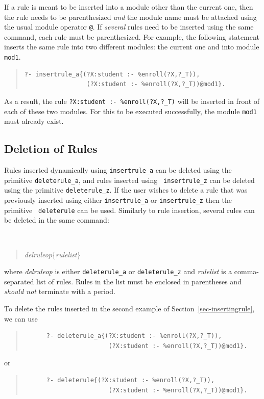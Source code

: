\documentclass[11pt]{article}
\begin{document}
If a rule is meant to be inserted into a module other than the current one,
then the rule needs to be parenthesized \emph{and} the module name must be
attached using the usual module operator {\tt @}. If \emph{several} rules
need to be inserted using the same command, each rule must be
parenthesized.  For example, the following statement inserts the same rule
into two different modules: the current one and into module {\tt mod1}.
\begin{quote}
\begin{verbatim}
?- insertrule_a{(?X:student :- %enroll(?X,?_T)),
                 (?X:student :- %enroll(?X,?_T))@mod1}.
\end{verbatim}
\end{quote}
As a result, the rule {\tt ?X:student :- \verb|%|enroll(?X,?\_T)} will be
inserted in front of each of these two modules.  For this to be executed
successfully, the module {\tt mod1} must already exist.


\subsection{Deletion of Rules}
\label{sec-deletingrule}

Rules inserted dynamically using {\tt insertrule\_a} can be deleted using
the primitive {\tt deleterule\_a}, and rules inserted using {\tt
  insertrule\_z} can be deleted using the primitive {\tt deleterule\_z}. If
the user wishes to delete a rule that was previously inserted using either
{\tt insertrule\_a} or {\tt insertrule\_z} then the primitive {\tt
  deleterule} can be used. Similarly to rule insertion, several rules can be
deleted in the same command:
{\tt
\begin{quote}
\emph{delruleop}\{\emph{rulelist}\}
\end{quote}
}
\noindent
where \emph{delruleop} is either {\tt deleterule\_a} or {\tt deleterule\_z}
and \emph{rulelist} is a comma-separated list of rules. Rules in the list
must be enclosed in parentheses and \emph{should not} terminate with a
period.

To delete the rules inserted in the second example of
Section~\ref{sec-insertingrule}, we can use
\begin{quote}
\begin{verbatim}
      ?- deleterule_a{(?X:student :- %enroll(?X,?_T)),
                       (?X:student :- %enroll(?X,?_T))@mod1}.
\end{verbatim}
\end{quote}
or
\begin{quote}
\begin{verbatim}
      ?- deleterule{(?X:student :- %enroll(?X,?_T)),
                       (?X:student :- %enroll(?X,?_T))@mod1}.
\end{verbatim}
\end{quote}
\end{document}
